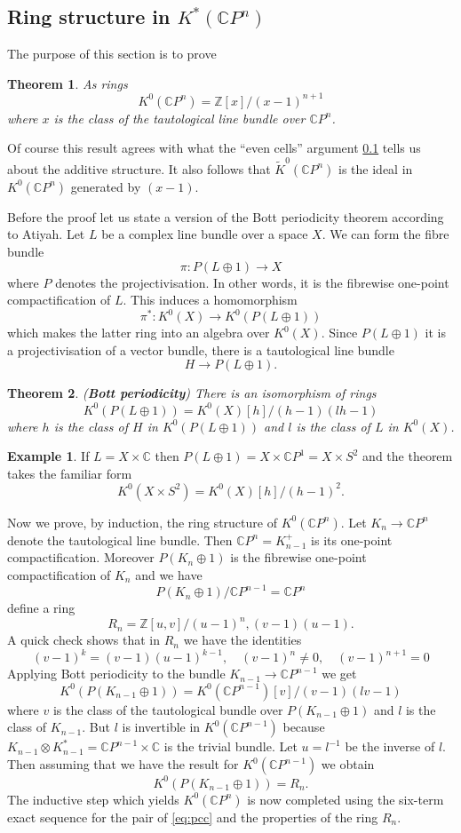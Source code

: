 \documentclass[a4paper,10pt]{article}
\theoremstyle{plain}%
\newtheorem{thm}{Theorem}
\theoremstyle{definition}
\newtheorem{exmp}{Example}
\theoremstyle{remark}
\newcommand{\ZZ}{\mathbb{Z}}
\newcommand{\CC}{\mathbb{C}}
\newcommand{\KR}{\widetilde{K}}   %
\newcommand{\cp}{\CC P}   %
\begin{document}
\subsection{Ring structure in $K^*(\cp^n)$}

The purpose of this section is to prove

\begin{thm}
As rings
$$
K^0(\cp^n)=\ZZ[x]/(x-1)^{n+1}
$$
where $x$ is the class of the tautological line bundle over $\cp^n$.
\end{thm}

Of course this result agrees with what the ``even cells'' argument \ref{} tells us about the additive structure. It also follows that $\KR^0(\cp^n)$ is the ideal in $K^0(\cp^n)$ generated by $(x-1)$.

Before the proof let us state a version of the Bott periodicity theorem according to Atiyah. Let $L$ be a complex line bundle over a space $X$. We can form the fibre bundle
$$\pi: P(L\oplus 1)\to X$$
where $P$ denotes the projectivisation. In other words, it is the fibrewise one-point compactification of $L$. This induces a homomorphism
$$\pi^*:K^0(X)\to K^0(P(L\oplus 1))$$
which makes the latter ring into an algebra over $K^0(X)$. Since $P(L\oplus 1)$ it is a projectivisation of a vector bundle, there is a tautological line bundle 
$$H\to P(L\oplus 1).$$

\begin{thm}({\bf Bott periodicity})
There is an isomorphism of rings
$$K^0(P(L\oplus 1))=K^0(X)[h]/(h-1)(lh-1)$$
where $h$ is the class of $H$ in $K^0(P(L\oplus 1))$ and $l$ is the class of $L$ in $K^0(X)$.
\end{thm}

\begin{exmp}
If $L=X\times \CC$ then $P(L\oplus 1)=X\times \cp^1=X\times S^2$ and the theorem takes the familiar form 
$$K^0(X\times S^2)=K^0(X)[h]/(h-1)^2.$$
\end{exmp}

Now we prove, by induction, the ring structure of $K^0(\cp^n)$. Let $K_n\to \cp^n$ denote the tautological line bundle. Then $\cp^n=K_{n-1}^+$ is its one-point compactification. Moreover $P(K_n\oplus 1)$ is the fibrewise one-point compactification of $K_n$ and we have
\begin{equation}\label{eq:pcc}P(K_n\oplus 1)/\cp^{n-1}=\cp^n\end{equation}
define a ring
$$R_n=\ZZ[u,v]/(u-1)^n,(v-1)(u-1).$$
A quick check shows that in $R_n$ we have the identities
$$(v-1)^k=(v-1)(u-1)^{k-1},\quad (v-1)^n\neq 0, \quad (v-1)^{n+1}=0$$
Applying Bott periodicity to the bundle $K_{n-1}\to\cp^{n-1}$ we get
$$K^0(P(K_{n-1}\oplus 1)) = K^0(\cp^{n-1})[v]/(v-1)(lv-1)$$
where $v$ is the class of the tautological bundle over $P(K_{n-1}\oplus 1)$ and $l$ is the class of $K_{n-1}$. But $l$ is invertible in $K^0(\cp^{n-1})$ because $K_{n-1}\otimes K_{n-1}^\ast=\cp^{n-1}\times \CC$ is the trivial bundle. Let $u=l^{-1}$ be the inverse of $l$. Then assuming that we have the result for $K^0(\cp^{n-1})$ we obtain
$$K^0(P(K_{n-1}\oplus 1))=R_n.$$
The inductive step which yields $K^0(\cp^n)$ is now completed using the six-term exact sequence for the pair of \eqref{eq:pcc} and the properties of the ring $R_n$.
\end{document}
